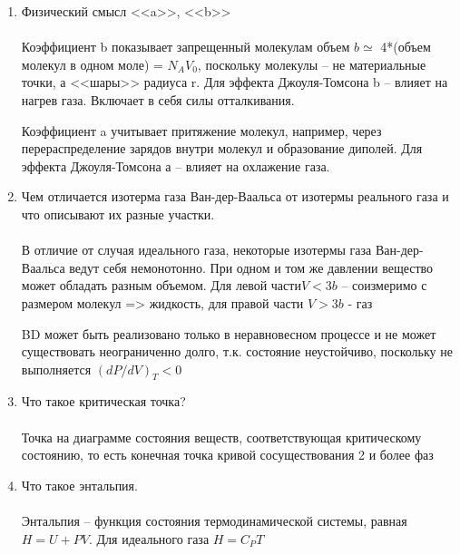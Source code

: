 \documentclass[a4paper,12pt]{article} %
\begin{document}
\begin{enumerate}

\item  Физический смысл <<a>>, <<b>> \\ \\
Коэффициент b показывает запрещенный молекулам объем $b \simeq$ 4*(объем молекул в одном моле) = $N_AV_0$, поскольку молекулы -- не материальные точки, а <<шары>> радиуса r. Для эффекта Джоуля-Томсона b -- влияет на нагрев газа. Включает в себя силы отталкивания.

Коэффициент a учитывает притяжение молекул, например, через перераспределение зарядов внутри молекул и образование диполей. Для эффекта Джоуля-Томсона а -- влияет на охлажение газа. 
\item Чем отличается изотерма газа Ван-дер-Ваальса от изотермы реального газа и что описывают их разные участки.\\ \\
В отличие от случая идеального газа, некоторые изотермы газа Ван-дер-Ваальса ведут себя немонотонно. При одном и том же давлении вещество может обладать разным объемом. Для левой части$V < 3b$ -- соизмеримо с размером молекул => жидкость, для правой части $V > 3b$ - газ 

BD может быть реализовано только в неравновесном процессе и не может существовать неограниченно долго, т.к. состояние неустойчиво, поскольку не выполняется $(dP/dV)_T < 0$
\begin{figure}[h]
\end{figure}
\item Что такое критическая точка?\\ \\ 
Точка на диаграмме состояния веществ, соответствующая критическому состоянию, то есть конечная точка кривой сосуществования 2 и более фаз 
\item Что такое энтальпия.\\ \\
Энтальпия -- функция состояния термодинамической системы, равная $H = U + PV$. Для идеального газа $H = C_PT$


\end{enumerate}
\end{document}
